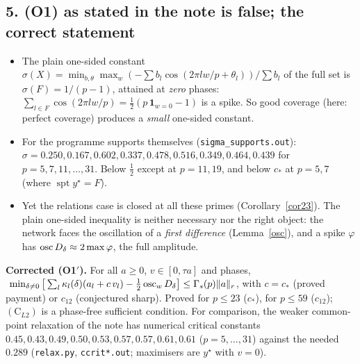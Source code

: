 \documentclass[11pt]{article}
\theoremstyle{remark}\newtheorem{remark}[theorem]{Remark}
\begin{document}
\subsection*{5. (O1) as stated in the note is false; the correct statement}
\begin{itemize}
\item The plain one-sided constant $\sigma(X)=\min_{b,\theta}\max_w(-\sum b_l\cos(2\pi lw/p+\theta_l))/\sum b_l$ of the full set is
$\sigma(F)=1/(p-1)$, attained at \emph{zero} phases: $\sum_{l\in F}\cos(2\pi lw/p)=\frac12(p\,\mathbf 1_{w=0}-1)$ is a spike.  So good
coverage (here: perfect coverage) produces a \emph{small} one-sided constant.
\item For the programme supports themselves (\texttt{sigma\_supports.out}): $\sigma=0.250,0.167,0.602,0.337,0.478,0.516,0.349,0.464,0.439$
for $p=5,7,11,\dots,31$.  Below $\frac12$ except at $p=11,19$, and below $c_*$ at $p=5,7$ (where $\operatorname{spt}y^\star=F$).
\item Yet the relations case is closed at all these primes (Corollary~\ref{cor23}).  The plain one-sided inequality is neither necessary
nor the right object: the network faces the oscillation of a \emph{first difference} (Lemma~\ref{osc}), and a spike $\varphi$ has
$\operatorname{osc} D_\delta\approx2\max\varphi$, the full amplitude.
\end{itemize}
\textbf{Corrected (O1$'$).}  For all $a\ge0$, $v\in[0,\tau a]$ and phases,
$\ \min_{\delta\ne0}\big[\sum_l\kappa_l(\delta)(a_l+c\,v_l)-\frac12\osc_wD_\delta\big]\le\Gamma_s(p)\|a\|_r$, with $c=c_*$ (proved payment) or $c_{12}$
(conjectured sharp).  Proved for $p\le23$ ($c_*$), for $p\le59$ ($c_{12}$); $(\mathrm C_{L2})$ is a phase-free sufficient condition.
For comparison, the weaker common-point relaxation of the note has numerical critical constants $0.45,0.43,0.49,0.50,0.53,0.57,0.57,0.61,0.61$
($p=5,\dots,31$) against the needed $0.289$ (\texttt{relax.py}, \texttt{ccrit*.out}; maximisers are $y^\star$ with $v=0$).
\end{document}
